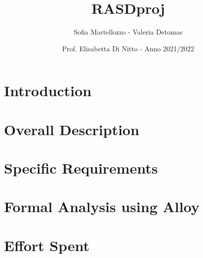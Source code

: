 \documentclass{article}
\title{RASDproj}
\date{Prof. Elisabetta Di Nitto  -  Anno 2021/2022}
\author{Sofia Martellozzo - 
      Valeria Detomas 
}
\begin{document}
\maketitle
\newpage
\renewcommand\contentsname{Contents}
\tableofcontents

\newpage

\section{Introduction}


\section{Overall Description}


\section{Specific Requirements}


\section{Formal Analysis using Alloy}


\section{Effort Spent}
\end{document}
